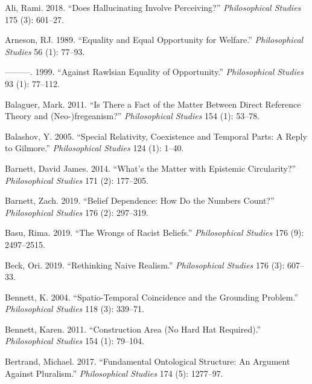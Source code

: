 \documentclass[
  10pt,
  letterpaper,
  DIV=11,
  numbers=noendperiod,
  twoside]{scrartcl}
\newlength{\cslhangindent}
\newenvironment{CSLReferences}[2] %
 {\begin{list}{}{%
  \setlength{\itemindent}{0pt}
  \setlength{\leftmargin}{0pt}
  \setlength{\parsep}{0pt}
  \ifodd #1
   \setlength{\leftmargin}{\cslhangindent}
   \setlength{\itemindent}{-1\cslhangindent}
  \fi
  \setlength{\itemsep}{#2\baselineskip}}}
 {\end{list}}
\begin{document}
\label{refs}
\begin{CSLReferences}{1}{0}
Ali, Rami. 2018. {``Does Hallucinating Involve Perceiving?''}
\emph{Philosophical Studies} 175 (3): 601--27.

Arneson, RJ. 1989. {``Equality and Equal Opportunity for Welfare.''}
\emph{Philosophical Studies} 56 (1): 77--93.

---------. 1999. {``Against Rawlsian Equality of Opportunity.''}
\emph{Philosophical Studies} 93 (1): 77--112.

Balaguer, Mark. 2011. {``Is There a Fact of the Matter Between Direct
Reference Theory and (Neo-)fregeanism?''} \emph{Philosophical Studies}
154 (1): 53--78.

Balashov, Y. 2005. {``Special Relativity, Coexistence and Temporal
Parts: A Reply to Gilmore.''} \emph{Philosophical Studies} 124 (1):
1--40.

Barnett, David James. 2014. {``What's the Matter with Epistemic
Circularity?''} \emph{Philosophical Studies} 171 (2): 177--205.

Barnett, Zach. 2019. {``Belief Dependence: How Do the Numbers Count?''}
\emph{Philosophical Studies} 176 (2): 297--319.

Basu, Rima. 2019. {``The Wrongs of Racist Beliefs.''}
\emph{Philosophical Studies} 176 (9): 2497--2515.

Beck, Ori. 2019. {``Rethinking Naive Realism.''} \emph{Philosophical
Studies} 176 (3): 607--33.

Bennett, K. 2004. {``Spatio-Temporal Coincidence and the Grounding
Problem.''} \emph{Philosophical Studies} 118 (3): 339--71.

Bennett, Karen. 2011. {``Construction Area (No Hard Hat Required).''}
\emph{Philosophical Studies} 154 (1): 79--104.

Bertrand, Michael. 2017. {``Fundamental Ontological Structure: An
Argument Against Pluralism.''} \emph{Philosophical Studies} 174 (5):
1277--97.


\end{CSLReferences}
\end{document}
